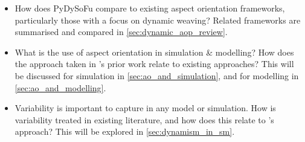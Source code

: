 \begin{itemize}
    \item How does PyDySoFu compare to existing aspect orientation frameworks,
    particularly those with a focus on dynamic weaving? Related frameworks are
    summarised and compared in \cref{sec:dynamic_aop_review}.

    \item What is the use of aspect orientation in simulation \& modelling? How
    does the approach taken in \pdsf's prior work relate to existing
    approaches? This will be discussed for simulation in
    \cref{sec:ao_and_simulation}, and for modelling in
    \cref{sec:ao_and_modelling}.
    
    \item Variability is important to capture in any \sociotechnical model or
    simulation. How is variability treated in existing literature, and how does
    this relate to \pdsf's approach? This will be explored in
    \cref{sec:dynamism_in_sm}.
\end{itemize}


